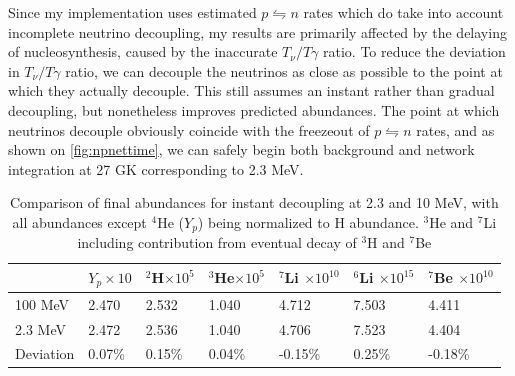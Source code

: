 Since my implementation uses estimated $p\leftrightharpoons n$ rates which do take into account incomplete neutrino decoupling, my results are primarily affected by the delaying of nucleosynthesis, caused by the inaccurate $T_\nu/T\gamma$ ratio. To reduce the deviation in $T_\nu/T\gamma$ ratio, we can decouple the neutrinos as close as possible to the point at which they actually decouple. This still assumes an instant rather than gradual decoupling, but nonetheless improves predicted abundances. The point at which neutrinos decouple obviously coincide with the freezeout of $p\leftrightharpoons n$ rates, and as shown on \ref{fig:npnettime}, we can safely begin both background and network integration at 27 GK corresponding to 2.3 MeV. 
\begin{table}[ht]
    \begin{tabular}{l|llllll}
        & $Y_p \times 10$ & \hspace{-0.34em}$^{2}$H$ \times 10^{5}$ & \hspace{-0.34em}$^{3}$He$ \times 10^{5}$ & \hspace{-0.34em}$^{7}$Li $ \times 10^{10}$& \hspace{-0.34em}$^{6}$Li $ \times 10^{15}$& \hspace{-0.34em}$^{7}$Be $ \times 10^{10}$\\ \hline
    100 MeV & 2.470            & 2.532 & 1.040 & 4.712 & 7.503 & 4.411     \\ \hline
    2.3 MeV  & 2.472            & 2.536 & 1.040 & 4.706 & 7.523 & 4.404   \\ \hline
    Deviation & 0.07\%           & 0.15\% & 0.04\% & -0.15\% & 0.25\% & -0.18\%      
    \end{tabular}
    \caption{Comparison of final abundances for instant decoupling at 2.3 and 10 MeV, with all abundances except ${}^4$He ($Y_p$) being normalized to H abundance. ${}^3$He and ${}^7$Li including contribution from eventual decay of ${}^3$H and ${}^7$Be}
    \label{tab:earlylatedecoup}
\end{table}

